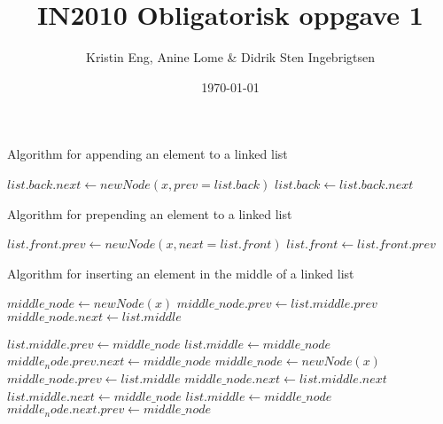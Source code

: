 \documentclass[a4paper, norsk] {article}
\title{IN2010 Obligatorisk oppgave 1}
\author{Kristin Eng, Anine Lome \& Didrik Sten Ingebrigtsen}
\date{\today}
\begin{document}
\maketitle

\begin{algorithm}
\label{ag:push_back}
\caption{Algorithm for appending an element to a linked list}
\begin{algorithmic}[0]
    \State $list.back.next \gets new Node(x, prev=list.back)$
    \State $list.back \gets list.back.next$
\EndProcedure
\end{algorithmic}
\end{algorithm}

\begin{algorithm}
\label{ag:push_front}
\caption{Algorithm for prepending an element to a linked list}
\begin{algorithmic}[0]
    \State $list.front.prev \gets new Node(x, next=list.front)$
    \State $list.front \gets list.front.prev$
\EndProcedure
\end{algorithmic}
\end{algorithm}

\begin{algorithm}
\label{ag:push_middle}
\caption{Algorithm for inserting an element in the middle of a linked list}
\begin{algorithmic}[0]
        \State $middle\_node \gets new Node(x)$
        \State $middle\_node.prev \gets list.middle.prev$
        \State $middle\_node.next \gets list.middle$

        \State $list.middle.prev \gets middle\_node$
        \State $list.middle \gets middle\_node$
        \State $middle_node.prev.next \gets middle\_node$
    \Else
        \State $middle\_node \gets new Node(x)$
        \State $middle\_node.prev \gets list.middle$
        \State $middle\_node.next \gets list.middle.next$
        \State $list.middle.next \gets middle\_node$
        \State $list.middle \gets middle\_node$
        \State $middle_node.next.prev \gets middle\_node$
    \EndIf
\EndProcedure
\end{algorithmic}
\end{algorithm}
\end{document}
